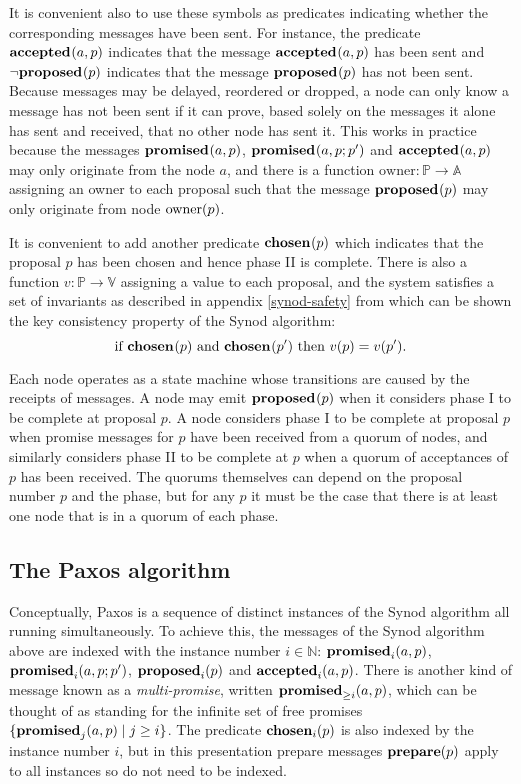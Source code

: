 \documentclass[journal]{IEEEtran}
\begin{document}
It is convenient also to use these symbols as predicates indicating whether the
corresponding messages have been sent. For instance, the predicate
$\mathbf{accepted}_{}(a,p)$ indicates that the message $\mathbf{accepted}_{}(a,p)$ has been sent and
$\neg \mathbf{proposed}_{}(p)$ indicates that the message $\mathbf{proposed}_{}(p)$ has not been sent.
Because messages may be delayed, reordered or dropped, a node can only know a
message has not been sent if it can prove, based solely on the messages it
alone has sent and received, that no other node has sent it. This works in
practice because the messages $\mathbf{promised}_{}(a,p)$, $\mathbf{promised}_{}(a,p;p')$ and
$\mathbf{accepted}_{}(a,p)$ may only originate from the node $a$, and there is a function
$\mathrm{owner} : \mathbb P \to \mathbb A$ assigning an owner to each proposal
such that the message $\mathbf{proposed}_{}(p)$ may only originate from node $\mathrm{owner}(p)$.

It is convenient to add another predicate $\mathbf{chosen}_{}(p)$ which indicates that
the proposal $p$ has been chosen and hence phase II is complete. There is also
a function $v : \mathbb P \to \mathbb V$ assigning a value to each proposal,
and the system satisfies a set of invariants as described in appendix
\ref{synod-safety} from which can be shown the key consistency property of the
Synod algorithm: \[\textrm{if } \mathbf{chosen}_{}(p) \textrm{ and } \mathbf{chosen}_{}(p')
\textrm { then } v(p) = v(p').\]

Each node operates as a state machine whose transitions are caused by the
receipts of messages. A node may emit $\mathbf{proposed}_{}(p)$ when it considers phase I to
be complete at proposal $p$. A node considers phase I to be complete at
proposal $p$ when promise messages for $p$ have been received from a quorum of
nodes, and similarly considers phase II to be complete at $p$ when a quorum of
acceptances of $p$ has been received. The quorums themselves can depend on the
proposal number $p$ and the phase, but for any $p$ it must be the case that
there is at least one node that is in a quorum of each phase.

\subsection{The Paxos algorithm}

Conceptually, Paxos is a sequence of distinct instances of the Synod algorithm
all running simultaneously. To achieve this, the messages of the Synod
algorithm above are indexed with the instance number $i \in \mathbb N$:
$\mathbf{promised}_{i}(a,p)$, $\mathbf{promised}_{i}(a,p;p')$, $\mathbf{proposed}_{i}(p)$ and $\mathbf{accepted}_{i}(a,p)$.
There is another kind of message known as a \textit{multi-promise}, written
$\mathbf{promised}_{\ge i}(a,p)$, which can be thought of as standing for the infinite set of
free promises ${\{ \mathbf{promised}_{j}(a,p) \mid j \ge i \}}$. The predicate
$\mathbf{chosen}_{i}(p)$ is also indexed by the instance number $i$, but in this
presentation prepare messages $\mathbf{prepare}(p)$ apply to all instances so do not need
to be indexed.
\end{document}
